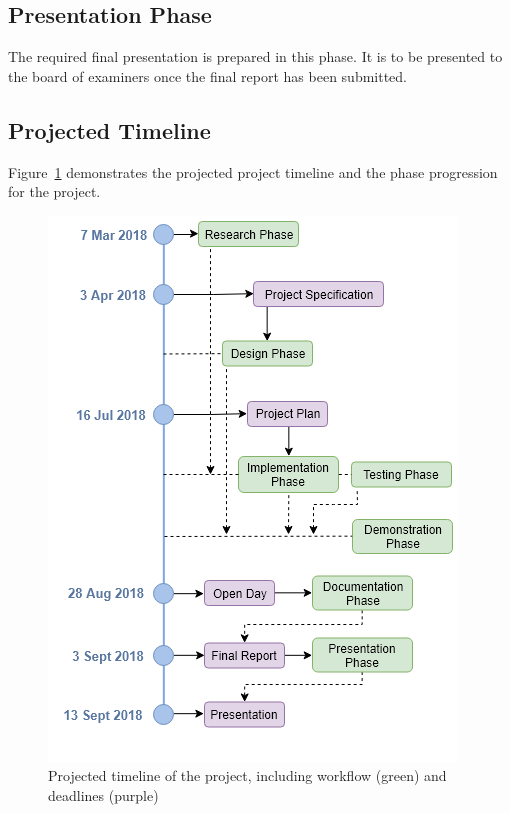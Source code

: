 \documentclass[10pt,twocolumn]{witseiepaper}
\begin{document}
	\subsection{Presentation Phase}
		The required final presentation is prepared in this phase. It is to be presented to the board of examiners once the final report has been submitted.
	
	\subsection{Projected Timeline}
	Figure~\ref{fig:timeline} demonstrates the projected project timeline and the phase progression for the project.
	
	\begin{figure}
		\centering
		\includegraphics[width=1\columnwidth]{media/timeline.png}
		\caption{Projected timeline of the project, including workflow (green) and deadlines (purple)}
		\raggedright
		\label{fig:timeline}
	\end{figure}
	
\end{document}
